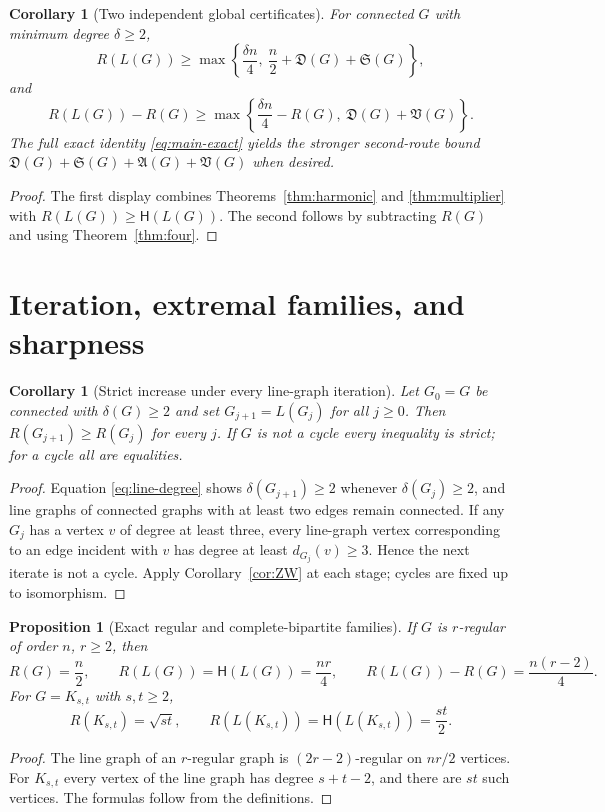 \documentclass[11pt,a4paper]{article}
\newtheorem{proposition}[theorem]{Proposition}
\newtheorem{corollary}[theorem]{Corollary}
\theoremstyle{remark}
\newcommand{\Def}{\mathfrak D}
\newcommand{\Sl}{\mathfrak S}
\newcommand{\Ag}{\mathfrak A}
\newcommand{\Var}{\mathfrak V}
\newcommand{\HH}{\mathsf H}
\begin{document}
\begin{corollary}[Two independent global certificates]\label{cor:hybrid}
For connected $G$ with minimum degree $\delta\ge2$,
\begin{equation}\label{eq:hybrid}
 R(L(G))\ge \max\left\{\frac{\delta n}{4},\ \frac n2+\Def(G)+\Sl(G)\right\},
\end{equation}
and
\[
 R(L(G))-R(G)\ge
 \max\left\{\frac{\delta n}{4}-R(G),\ \Def(G)+\Var(G)\right\}.
\]
The full exact identity \eqref{eq:main-exact} yields the stronger second-route bound $\Def(G)+\Sl(G)+\Ag(G)+\Var(G)$ when desired.
\end{corollary}
\begin{proof}
The first display combines Theorems~\ref{thm:harmonic} and \ref{thm:multiplier} with $R(L(G))\ge\HH(L(G))$. The second follows by subtracting $R(G)$ and using Theorem~\ref{thm:four}.
\end{proof}

\section{Iteration, extremal families, and sharpness}
\begin{corollary}[Strict increase under every line-graph iteration]\label{cor:iteration}
Let $G_0=G$ be connected with $\delta(G)\ge2$ and set $G_{j+1}=L(G_j)$ for all $j\ge0$. Then $R(G_{j+1})\ge R(G_j)$ for every $j$. If $G$ is not a cycle every inequality is strict; for a cycle all are equalities.
\end{corollary}
\begin{proof}
Equation \eqref{eq:line-degree} shows $\delta(G_{j+1})\ge2$ whenever $\delta(G_j)\ge2$, and line graphs of connected graphs with at least two edges remain connected. If any $G_j$ has a vertex $v$ of degree at least three, every line-graph vertex corresponding to an edge incident with $v$ has degree at least $d_{G_j}(v)\ge3$. Hence the next iterate is not a cycle. Apply Corollary~\ref{cor:ZW} at each stage; cycles are fixed up to isomorphism.
\end{proof}

\begin{proposition}[Exact regular and complete-bipartite families]\label{prop:families}
If $G$ is $r$-regular of order $n$, $r\ge2$, then
\begin{equation}\label{eq:regular}
 R(G)=\frac n2,\qquad R(L(G))=\HH(L(G))=\frac{nr}{4},\qquad
 R(L(G))-R(G)=\frac{n(r-2)}4.
\end{equation}
For $G=K_{s,t}$ with $s,t\ge2$,
\begin{equation}\label{eq:completebipartite}
 R(K_{s,t})=\sqrt{st},\qquad R(L(K_{s,t}))=\HH(L(K_{s,t}))=\frac{st}{2}.
\end{equation}
\end{proposition}
\begin{proof}
The line graph of an $r$-regular graph is $(2r-2)$-regular on $nr/2$ vertices. For $K_{s,t}$ every vertex of the line graph has degree $s+t-2$, and there are $st$ such vertices. The formulas follow from the definitions.
\end{proof}
\end{document}
